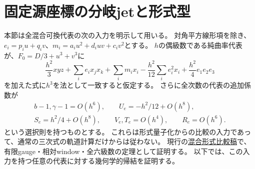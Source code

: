 \section{固定源座標の分岐jetと形式型}
本節は全混合可換代表の次の入力を明示して用いる。
対角平方線形項を除き、$e_i=p_iu+q_iv$、$m_i=a_iu^2+d_iuv+c_iv^2$とする。
$h$の偶級数である純曲率代表が、$F_0=D/3+u^3+v^3$に
\[
 \frac{h^2}3xyz+\sum_i e_ix_jx_k+\sum_i m_ix_i
 -\frac{h^2}{12}\sum_i e_i^2x_i+\frac{h^2}4e_1e_2e_3
\]
を加えた式に$h^3$を法として一致すると仮定する。
さらに全次数の代表の追加係数が
\begin{gather*}
 b-1,\gamma-1=O(h^6),\qquad U_e=-h^2/12+O(h^8),\\
 S_e=h^2/4+O(h^8),\qquad V_e,T_e=O(h^4),\qquad R_e=O(h^6).
\end{gather*}
という選択則を持つものとする。
これらは形式量子化からの比較の入力であって、通常の三次式の軌道計算だけからは従わない。
現行の\href{https://github.com/uedakazushi/nc-cubic2/blob/main/papers/sklyanin_mixed_formal_comparison.tex}{混合形式比較稿}で、有限gauge・相対window・全六級数の定理として証明する。
以下では、この入力を持つ任意の代表に対する幾何学的帰結を証明する。

